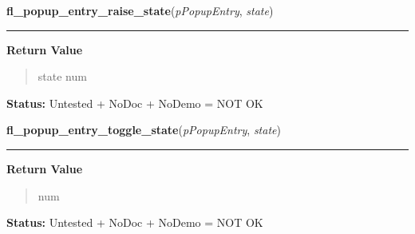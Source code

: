     \label{xformslib:library:fl_popup_entry_raise_state}

    \vspace{0.5ex}

\hspace{.8\funcindent}\begin{boxedminipage}{\funcwidth}

    \raggedright \textbf{fl\_popup\_entry\_raise\_state}(\textit{pPopupEntry}, \textit{state})

    \vspace{-1.5ex}

    \rule{\textwidth}{0.5\fboxrule}
\setlength{\parskip}{2ex}
\setlength{\parskip}{1ex}
      \textbf{Return Value}
    \vspace{-1ex}

      \begin{quote}
      state num

      \end{quote}

\textbf{Status:} Untested + NoDoc + NoDemo = NOT OK



    \end{boxedminipage}

    \label{xformslib:library:fl_popup_entry_toggle_state}

    \vspace{0.5ex}

\hspace{.8\funcindent}\begin{boxedminipage}{\funcwidth}

    \raggedright \textbf{fl\_popup\_entry\_toggle\_state}(\textit{pPopupEntry}, \textit{state})

    \vspace{-1.5ex}

    \rule{\textwidth}{0.5\fboxrule}
\setlength{\parskip}{2ex}
\setlength{\parskip}{1ex}
      \textbf{Return Value}
    \vspace{-1ex}

      \begin{quote}
      num

      \end{quote}

\textbf{Status:} Untested + NoDoc + NoDemo = NOT OK



    \end{boxedminipage}

